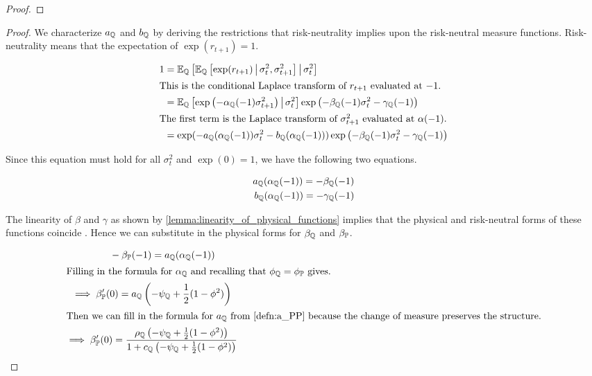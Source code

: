 \documentclass[11pt, letterpaper, twoside, final]{article}
\begin{document}
\begin{appendices}
\begin{proof}
\end{proof}




\physicalMeasureFunctions*

\begin{proof}
We characterize $a_{\mathbb{Q}}$ and $b_{\mathbb{Q}}$ by deriving the restrictions that risk-neutrality implies upon the
risk-neutral measure functions.
Risk-neutrality means that the expectation of $\exp(r_{t+1}) = 1$.

\begin{align}
    1 &= \E_{\QQ}\left[\E_{\QQ}\left[\exp(r_{t+1}) \mvert \sigma_t^2, \sigma^2_{t+1}\right]  \mvert \sigma^2_t
        \right] \\
%
    \intertext{This is the conditional Laplace transform of $r_{t+1}$ evaluated at $-1$.}
%
      \label{eqn:risk_neutral_at_neg_1}
    &= \E_{\QQ}\left[ \exp\left(-\alpha_{\QQ}(-1) \sigma^2_{t+1}\right)  \mvert \sigma^2_t \right]
       \exp\left(-\beta_{\QQ}(-1) \sigma^2_t - \gamma_{\QQ}(-1)\right)   \\
%
    \intertext{The first term is the Laplace transform of $\sigma^2_{t+1}$ evaluated at $\alpha(-1)$.}
%
      &= \exp(-a_{\QQ}(\alpha_{\QQ}(-1)) \sigma^2_t - b_{\QQ}(\alpha_{\QQ}(-1))) \exp\left(-\beta_{\QQ}(-1)
         \sigma^2_t - \gamma_{\QQ}(-1)\right)  
\end{align}

Since this equation must hold for all $\sigma_t^2$ and $\exp(0) = 1$, we have the following two equations.

\begin{align}
    a_{\mathbb{Q}}(\alpha_{\mathbb{Q}}(-1)) = - \beta_{\mathbb{Q}}(-1) \\
    b_{\mathbb{Q}}(\alpha_{\mathbb{Q}}(-1)) = - \gamma_{\mathbb{Q}}(-1) 
\end{align}


The linearity of $\beta$ and $\gamma$ as shown by \cref{lemma:linearity_of_physical_functions} implies that the
physical and risk-neutral forms of these functions coincide \textcite[Proposition 5]{khrapov2016affine}. 
Hence we can substitute in the physical forms for $\beta_{\mathbb{Q}}$ and $\beta_{\mathbb{P}}$.

\begin{gather}
    \label{eqn:beta_qq_at_minus_one}
    \phantom{\implies}   - \beta_{\PP}(-1) = a_{\QQ}(\alpha_{\QQ}(-1))\\
%
    \intertext{Filling in the formula for $\alpha_{\QQ}$ and recalling that $\phi_{\QQ} = \phi_{\PP}$ gives.}
%
    \implies \beta_{\PP}'(0) = a_{\QQ}\left(-\psi_{\QQ} + \frac{1}{2} (1- \phi^2)\right)  \\
%
    \intertext{Then we can fill in the formula for $a_{\QQ}$ from \cref{defn:a_PP} because the change of measure
    preserves the structure.}
%
    \implies \beta_{\PP}'(0) = \frac{\rho_{\QQ} \left(-\psi_{\QQ} + \frac{1}{2} (1- \phi^2)\right)}{1 + c_{\QQ}
    \left(-\psi_{\QQ} + \frac{1}{2} (1- \phi^2)\right)} 
    \label{eqn:beta_function_QQ}
\end{gather}


\end{proof}
\end{appendices}
\end{document}
